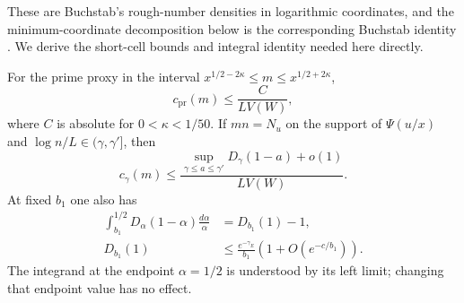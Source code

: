 These are Buchstab's rough-number densities in logarithmic
coordinates, and the minimum-coordinate decomposition below is the
corresponding Buchstab identity \cite{Buchstab1937}.
We derive the short-cell bounds and integral identity needed here directly.

\begin{lemma}\label{lem:proxy-densities}
For the prime proxy in the interval
$x^{1/2-2\kappa}\le m\le x^{1/2+2\kappa}$,
\begin{equation}\label{eq:prime-proxy-size}
 c_{\mathrm{pr}}(m)\le\frac{C}{LV(W)},
\end{equation}
where $C$ is absolute for $0<\kappa<1/50$. If $mn=N_u$ on the
support of $\Psi(u/x)$ and $\log n/L\in(\gamma,\gamma']$, then
\begin{equation}\label{eq:rough-proxy-size}
 c_\gamma(m)\le
 \frac{\sup_{\gamma\le a\le\gamma'}D_\gamma(1-a)+o(1)}{LV(W)}.
\end{equation}
At fixed $b_1$ one also has
\begin{align}
 \int_{b_1}^{1/2}D_\alpha(1-\alpha)\frac{d\alpha}{\alpha}
       &=D_{b_1}(1)-1,\label{eq:density-integral}\\
 D_{b_1}(1)&\le\frac{e^{-\gamma_E}}{b_1}
                 (1+O(e^{-c/b_1})).\label{eq:density-sieve-upper}
\end{align}
The integrand at the endpoint $\alpha=1/2$ is understood by
its left limit; changing that endpoint value has no effect.
\end{lemma}

